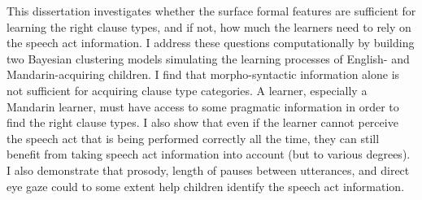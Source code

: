 This dissertation investigates whether the surface formal features are sufficient for learning the right clause types, and if not, how much the learners need to rely on the speech act information. I address these questions computationally by building two Bayesian clustering models simulating the learning processes of English- and Mandarin-acquiring children. I find that morpho-syntactic information alone is not sufficient for acquiring clause type categories. A learner, especially a Mandarin learner, must have access to some pragmatic information in order to find the right clause types. I also show that even if the learner cannot perceive the speech act that is being performed correctly all the time, they can still benefit from taking speech act information into account (but to various degrees). I also demonstrate that prosody, length of pauses between utterances, and direct eye gaze could to some extent help children identify the speech act information.



